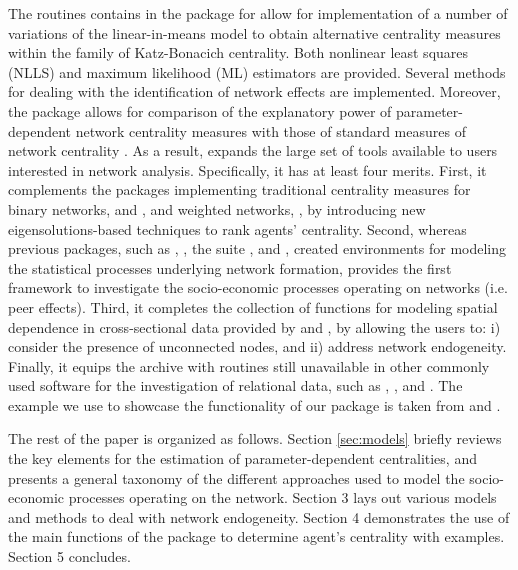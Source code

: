\documentclass[nojss]{jss}
\begin{document}
The routines contains in the package  for  \citep{R} allow for implementation of a number of variations of the linear-in-means model to obtain alternative centrality measures within the family of Katz-Bonacich centrality. Both nonlinear least squares (NLLS) and maximum likelihood (ML) estimators are provided. Several methods for dealing with the identification of network effects are implemented. Moreover, the  package allows for comparison of the explanatory power of parameter-dependent network centrality measures with those of standard measures of network centrality \citep{Wasserman+Faust:1994}. As a result,  expands the large set of tools available to  users interested in network analysis. Specifically, it has at least four merits. First, it complements the  packages implementing traditional centrality measures for binary networks,  \citep{igraph} and  \citep{sna}, and weighted networks,  \citep{tnet}, by introducing new eigensolutions-based techniques to rank agents' centrality. Second, whereas previous packages, such as  \citep{btergm},  \citep{hergm}, the  suite \citep{statnet}, and  \citep{xergm}, created environments for modeling the statistical processes underlying network formation,  provides the first framework to investigate the socio-economic processes operating on networks (i.e. peer effects). Third, it completes the collection of functions for modeling spatial dependence in cross-sectional data provided by  \citep{spdep} and  \citep{splm}, by allowing the users to: i) consider the presence of unconnected nodes, and ii) address network endogeneity. Finally, it equips the  archive with routines still unavailable in other commonly used software for the investigation of relational data, such as  \citep{Matlab},  \citep{Batagelj:2003},  \citep{Python} and  \citep{Stata}. The example we use to showcase the functionality of our  package is taken from \cite{Battaglini+Patacchini:2018} and \cite{Battaglini+Sciabolazza+Patacchini:2018}. %

The rest of the paper is organized as follows. Section \ref{sec:models} briefly reviews the key elements for the estimation of parameter-dependent centralities, and presents a general taxonomy of the different approaches used to model the socio-economic processes operating on the network. Section 3 lays out various models and methods to deal with network endogeneity. Section 4 demonstrates the use of the main functions of the package  to determine agent's centrality with examples. Section 5 concludes.
\end{document}
